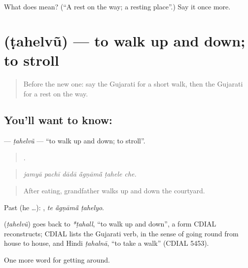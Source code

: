 \begin{tcolorbox}[breakable,colback=teal!4,colframe=teal!35!black,title={Before you move on}]
What does  mean? (\textquotedblleft{}A rest on the way; a resting place\textquotedblright{}.) Say it once more.
\end{tcolorbox}
\section[\texorpdfstring{\gu{ટહેલવું} (ṭahelvũ)}{ટહેલવું (ṭahelvũ)}]{ (ṭahelvũ) — to walk up and down; to stroll}

\label{lesson:GU-C408-tahelvu}



\begin{quote}
Before the new one: say the Gujarati for a short walk, then the Gujarati for a rest on the way.
\end{quote}

\subsection*{You'll want to know: }
\textbf{} — \emph{ṭahelvũ} — \textquotedblleft{}to walk up and down; to stroll\textquotedblright{}.

\begin{quote}
     .
\end{quote}

\begin{quote}
\emph{jamyā pachī dādā ā̃gṇāmā̃ ṭahele che.}
\end{quote}

\begin{quote}
After eating, grandfather walks up and down the courtyard.
\end{quote}

Past (he …):   , \emph{te ā̃gṇāmā̃ ṭahelyo}.

\begin{cousinweb}
\textbf{} (\emph{ṭahelvũ}) goes back to \emph{*ṭahall}, \textquotedblleft{}to walk up and down\textquotedblright{}, a form CDIAL reconstructs; CDIAL lists the Gujarati verb, in the sense of going round from house to house, and Hindi \emph{ṭahalnā}, \textquotedblleft{}to take a walk\textquotedblright{} (CDIAL 5453).
\end{cousinweb}

\begin{grammarlens}[title={What you've built}]
One more word for getting around.
\end{grammarlens}

